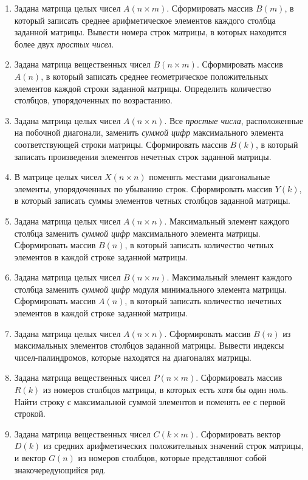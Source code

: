 \begin{enumerate}
\item Задана матрица целых чисел $A(n\times m)$. Сформировать массив
$B(m)$, в который записать среднее арифметическое элементов каждого столбца заданной матрицы.
Вывести номера строк матрицы, в которых находится более двух \emph{простых чисел}.
\item Задана матрица вещественных чисел $B(n\times m)$. Сформировать массив
$A(n)$, в который записать среднее геометрическое положительных элементов каждой строки
заданной матрицы. Определить количество столбцов, упорядоченных по возрастанию.
\item Задана матрица целых чисел $A(n\times n)$. Все \emph{простые числа}, расположенные на
побочной диагонали, заменить \emph{суммой цифр} максимального элемента соответствующей строки матрицы. Сформировать
массив $B(k)$, в который записать произведения элементов нечетных строк заданной матрицы.
\item В матрице целых чисел $X(n\times n)$ поменять местами диагональные элементы,  упорядоченных по
убыванию строк. Сформировать массив $Y(k)$, в который записать суммы элементов четных
столбцов заданной матрицы.
\item Задана матрица целых чисел $A(n\times n)$. Максимальный элемент каждого столбца заменить
\emph{суммой цифр} максимального элемента матрицы. Сформировать массив $B(n)$, в который
записать количество четных элементов в каждой строке заданной матрицы. 
\item Задана матрица целых чисел $B(n\times m)$. Максимальный элемент каждого столбца
заменить \emph{суммой цифр} модуля минимального элемента матрицы. Сформировать массив
$A(n)$, в который записать количество нечетных элементов в каждой строке заданной матрицы.
\item Задана матрица целых чисел $A(n\times n)$. Сформировать массив $B(n)$
из максимальных элементов столбцов заданной матрицы. Вывести индексы 
чисел-палиндромов, которые находятся на диагоналях матрицы. 
\item Задана матрица вещественных чисел $P(n\times m)$. Сформировать массив
$R(k)$ из номеров столбцов матрицы, в которых есть хотя бы один ноль. Найти строку с
максимальной суммой элементов и поменять ее с первой строкой.
\item Задана матрица вещественных чисел $C(k\times m)$. Сформировать вектор
$D(k)$ из средних арифметических положительных значений строк матрицы, и вектор
$G(n)$ из номеров столбцов, которые представляют собой знакочередующийся ряд.

\end{enumerate}
